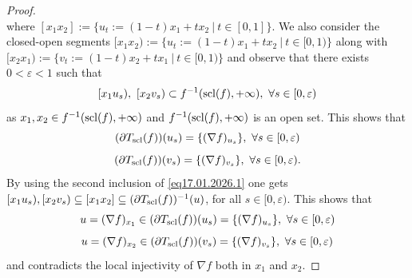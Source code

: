 \documentclass[12pt,twoside,reqno]{amsart}
\theoremstyle{definition}
\numberwithin{equation}{section}
\begin{document}
\begin{proof}
\begin{equation}
\end{equation}
where $[x_1x_2]:=\{u_t:=(1-t)x_1+tx_2 \ | \ t\in[0,1]\}$. We also consider the closed-open segments $[x_1x_2):=\{u_t:=(1-t)x_1+tx_2 \ | \ t\in[0,1)\}$ along 
with $[x_2x_1):=\{v_t:=(1-t)x_2+tx_1 \ | \ t\in[0,1)\}$ and observe that there exists $0<\varepsilon<1$ such that 
\[[x_1u_s), \ [x_2v_s)\subset f^{-1}({\rm scl}(f),+\infty), \ \forall s\in[0,\varepsilon)\] as $x_1,x_2\in f^{-1}({\rm scl}(f),+\infty)$ 
and $f^{-1}({\rm scl}(f),+\infty)$ is an open set. This shows that 
\[
(\partial T_{\rm scl}(f))(u_s)=\{(\nabla f)_{u_s}\}, \ \forall s\in[0,\varepsilon) 
\]
\[
(\partial T_{\rm scl}(f))(v_s)=\{(\nabla f)_{v_s}\}, \ \forall s\in[0,\varepsilon).
\]
By using the second inclusion of \eqref{eq17.01.2026.1} one gets
$[x_1u_s), [x_2v_s) \subseteq [x_1x_2]\subseteq (\partial T_{\rm scl}(f))^{-1}(u)$,
for all $s\in[0,\varepsilon)$. This shows that 
\[
u=(\nabla f)_{x_1}\in (\partial T_{\rm scl}(f))(u_s)=\{(\nabla f)_{u_s}\}, \ \forall s\in[0,\varepsilon) 
\]
\[
u=(\nabla f)_{x_2}\in (\partial T_{\rm scl}(f))(v_s)=\{(\nabla f)_{v_s}\}, \ \forall s\in[0,\varepsilon) 
\]
and contradicts the local injectivity of $\nabla f$ both in $x_1$ and $x_2$.
\end{proof}
\end{document}
